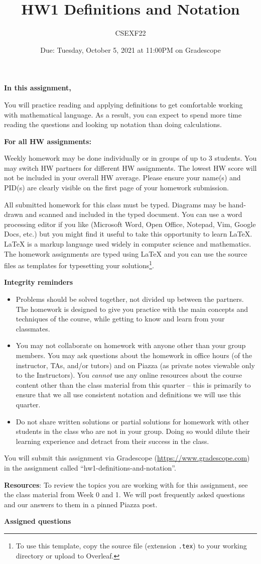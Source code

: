 \documentclass[12pt, oneside]{article}
\author{CSEXF22}
\title{HW1 Definitions and Notation}
\date{Due: Tuesday, October 5, 2021 at 11:00PM on Gradescope}
\newcommand{\instructions}{{\bf For all HW assignments:}

Weekly homework may be done individually or in groups of up to 3 students. 
You may switch HW partners for different HW assignments. 
The lowest HW score will not be included in your overall HW average. 
Please ensure your name(s) and PID(s) are clearly visible on the first page of your homework submission.

All submitted homework for this class must be typed. 
Diagrams may be hand-drawn and scanned and included in the typed document. 
You can use a word processing editor if you like (Microsoft Word, Open Office, Notepad, Vim, Google Docs, etc.) 
but you might find it useful to take this opportunity to learn LaTeX. 
LaTeX is a markup language used widely in computer science and mathematics. 
The homework assignments are typed using LaTeX and you can use the source files 
as templates for typesetting your solutions\footnote{To use this template, copy the source file (extension \texttt{.tex}) 
to your working directory or upload to Overleaf.}.


{\bf Integrity reminders}
\begin{itemize}
\item Problems should be solved together, not divided up between the partners. The homework is
designed to give you practice with the main concepts and techniques of the course, 
while getting to know and learn from your classmates.
\item You may not collaborate on homework with anyone other than your group members.
You may ask questions about the homework in office hours (of the instructor, TAs, and/or tutors) and 
on Piazza (as private notes viewable only to the Instructors).  
You \emph{cannot} use any online resources about the course content other than the class material 
from this quarter -- this is primarily to ensure that we all use consistent notation and
definitions we will use this quarter.
\item Do not share written solutions or partial solutions for homework with 
other students in the class who are not in your group. Doing so would dilute their learning 
experience and detract from their success in the class.
\end{itemize}

}
\begin{document}
\maketitle
\thispagestyle{fancy}


{\bf In this assignment,}

You will practice reading and
applying definitions to get comfortable working with mathematical language. As
a result, you can expect to spend more time reading the questions and looking
up notation than doing calculations.

\instructions

You will submit this assignment via Gradescope
(\href{https://www.gradescope.com}{https://www.gradescope.com}) 
in the assignment called ``hw1-definitions-and-notation''.


{\bf Resources}: To review the topics you are working with 
for this assignment, see the class material from  Week 0 and 1.
We will post frequently asked questions and our answers to them in a 
pinned Piazza post.

{\bf Assigned questions}
\end{document}
